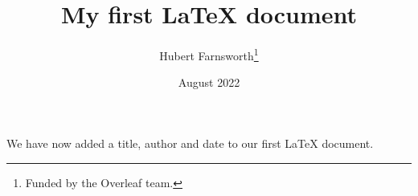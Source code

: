 \documentclass[12pt, letterpaper]{article}
\title{My first LaTeX document}
\author{Hubert Farnsworth\thanks{Funded by the Overleaf team.}}
\date{August 2022}
\begin{document}
\maketitle 
We have now added a title, author and date to our first \LaTeX{} document.
\end{document}
